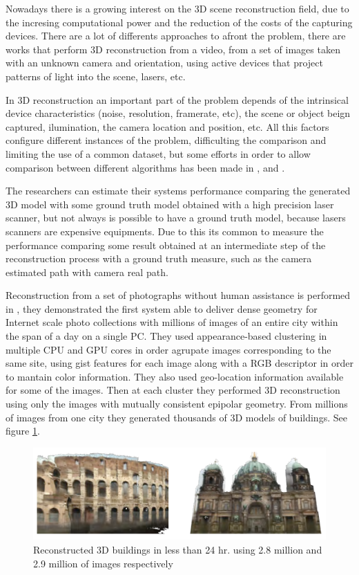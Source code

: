  
Nowadays there is a growing interest on the 3D scene reconstruction field, due to the incresing computational power and the reduction of 
the costs of the capturing devices. There are a lot of differents approaches to afront the problem, there are works that perform 3D reconstruction 
from a video, from a set of images taken with an unknown camera and orientation, using active devices that project patterns of light into 
the scene, lasers, etc. 

In 3D reconstruction an important part of the problem depends of the intrinsical 
device characteristics (noise, resolution, framerate, etc), the scene or object beign captured, ilumination, the camera location and position, etc. All this factors configure different instances of the problem, difficulting the comparison and limiting the use of a common dataset, but some efforts in order to allow comparison between different algorithms has been made 
in \cite{seitz2006}, \cite{ponce2006} and \cite{scharstein2001}.

The researchers can estimate their systems performance comparing the generated 3D model with some 
ground truth model obtained with a high precision laser scanner, but not always is possible to have a ground truth model, because lasers scanners 
are expensive equipments. Due to this its common to measure the performance
 comparing some result obtained at an intermediate step of the reconstruction process with a ground truth measure, 
such as the camera estimated path with camera real path.   

Reconstruction from a set of photographs without human assistance is performed in \cite{jan}, they demonstrated the first system able to deliver dense geometry for Internet scale photo collections with millions of images of an entire city within the span of a day on a single PC. They used appearance-based clustering in multiple CPU and GPU cores 
in order agrupate images corresponding to the same site, using gist features for each image along with a RGB
descriptor in order to mantain color information. They also used geo-location information available for some of 
the images. Then at each cluster they performed 3D reconstruction using only the images with mutually consistent epipolar 
geometry. From millions of images from one city they generated thousands of 3D models of buildings. See figure \ref{fig:jan}. 


\begin{figure}[h!]
\begin{center}
\includegraphics[scale=0.25]{images/jan}
\caption{Reconstructed 3D buildings in less than 24 hr. using 2.8 million and 2.9 million of images respectively}
\label{fig:jan}
\end{center}
\end{figure}

